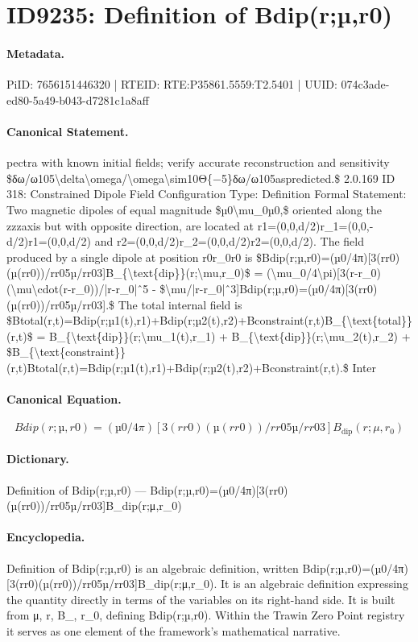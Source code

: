 \section*{ID9235: Definition of Bdip(r;µ,r0)}
\paragraph{Metadata.}
PiID: 7656151446320 | RTEID: RTE:P35861.5559:T2.5401 | UUID: 074c3ade-ed80-5a49-b043-d7281c1a8aff

\paragraph{Canonical Statement.}
pectra with known initial fields; verify accurate reconstruction and sensitivity \$δω/ω105\textbackslash{}delta\textbackslash{}omega/\textbackslash{}omega\textbackslash{}sim10Θ\{−5\}δω/ω105aspredicted.\$ 2.0.169 ID 318: Constrained Dipole Field Configuration Type: Definition Formal Statement: Two magnetic dipoles of equal magnitude \$µ0\textbackslash{}mu\_0µ0,\$ oriented along the zzzaxis but with opposite direction, are located at r1=(0,0,d/2)r\_1=(0,0,-d/2)r1=(0,0,d/2) and r2=(0,0,d/2)r\_2=(0,0,d/2)r2=(0,0,d/2). The field produced by a single dipole at position r0r\_0r0 is \$Bdip(r;µ,r0)=(µ0/4π)[3(rr0)(µ(rr0))/rr05µ/rr03]B\_\{\textbackslash{}text\{dip\}\}(r;\textbackslash{}mu,r\_0)\$ = (\textbackslash{}mu\_0/4\textbackslash{}pi)[3(r-r\_0)(\textbackslash{}mu\textbackslash{}cdot(r-r\_0))/|r-r\_0|ˆ5 - \$\textbackslash{}mu/|r-r\_0|ˆ3]Bdip(r;µ,r0)=(µ0/4π)[3(rr0)(µ(rr0))/rr05µ/rr03].\$ The total internal field is \$Btotal(r,t)=Bdip(r;µ1(t),r1)+Bdip(r;µ2(t),r2)+Bconstraint(r,t)B\_\{\textbackslash{}text\{total\}\}(r,t)\$ = B\_\{\textbackslash{}text\{dip\}\}(r;\textbackslash{}mu\_1(t),r\_1) + B\_\{\textbackslash{}text\{dip\}\}(r;\textbackslash{}mu\_2(t),r\_2) + \$B\_\{\textbackslash{}text\{constraint\}\}(r,t)Btotal(r,t)=Bdip(r;µ1(t),r1)+Bdip(r;µ2(t),r2)+Bconstraint(r,t).\$ Inter

\paragraph{Canonical Equation.}
\[
Bdip(r;µ,r0)=(µ0/4π)[3(rr0)(µ(rr0))/rr05µ/rr03]B_{\text{dip}}(r;\mu,r_0)
\]

\paragraph{Dictionary.}
Definition of Bdip(r;µ,r0) — Bdip(r;µ,r0)=(µ0/4π)[3(rr0)(µ(rr0))/rr05µ/rr03]B\_dip(r;μ,r\_0)

\paragraph{Encyclopedia.}
Definition of Bdip(r;µ,r0) is an algebraic definition, written Bdip(r;µ,r0)=(µ0/4π)[3(rr0)(µ(rr0))/rr05µ/rr03]B\_dip(r;μ,r\_0). It is an algebraic definition expressing the quantity directly in terms of the variables on its right-hand side. It is built from μ, r, B\_, r\_0, defining Bdip(r;µ,r0). Within the Trawin Zero Point registry it serves as one element of the framework's mathematical narrative.
